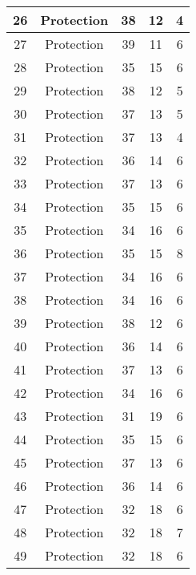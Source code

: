 \documentclass[results.tex]{subfiles}
\begin{document}
\begin{center}
\begin{tabular}{| c || c | c | c | c |}
    \hline
    26 & Protection & 38 & 12 & 4 \\ 
    \hline
    27 & Protection & 39 & 11 & 6 \\ 
    \hline
    28 & Protection & 35 & 15 & 6 \\ 
    \hline
    29 & Protection & 38 & 12 & 5 \\ 
    \hline
    30 & Protection & 37 & 13 & 5 \\ 
    \hline
    31 & Protection & 37 & 13 & 4 \\ 
    \hline
    32 & Protection & 36 & 14 & 6 \\ 
    \hline
    33 & Protection & 37 & 13 & 6 \\ 
    \hline
    34 & Protection & 35 & 15 & 6 \\ 
    \hline
    35 & Protection & 34 & 16 & 6 \\ 
    \hline
    36 & Protection & 35 & 15 & 8 \\ 
    \hline
    37 & Protection & 34 & 16 & 6 \\ 
    \hline
    38 & Protection & 34 & 16 & 6 \\ 
    \hline
    39 & Protection & 38 & 12 & 6 \\ 
    \hline
    40 & Protection & 36 & 14 & 6 \\ 
    \hline
    41 & Protection & 37 & 13 & 6 \\ 
    \hline
    42 & Protection & 34 & 16 & 6 \\ 
    \hline
    43 & Protection & 31 & 19 & 6 \\ 
    \hline
    44 & Protection & 35 & 15 & 6 \\ 
    \hline
    45 & Protection & 37 & 13 & 6 \\ 
    \hline
    46 & Protection & 36 & 14 & 6 \\ 
    \hline
    47 & Protection & 32 & 18 & 6 \\ 
    \hline
    48 & Protection & 32 & 18 & 7 \\ 
    \hline
    49 & Protection & 32 & 18 & 6 \\ 
    \hline   \end{tabular}
\end{center}
\end{document}
